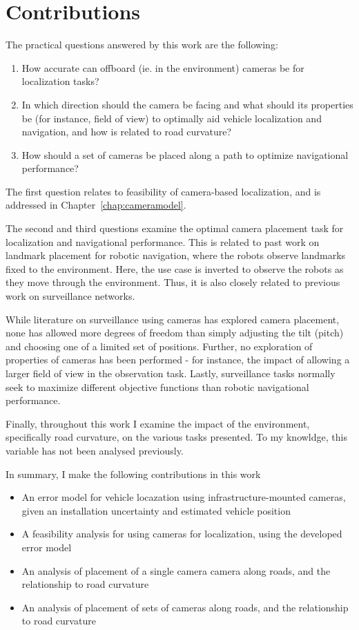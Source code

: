 \documentclass[a4paper,12pt,twoside,openright]{report}
\begin{document}
\section{Contributions}

The practical questions answered by this work are the following:
\begin{enumerate}
    \item How accurate can offboard (ie. in the environment) cameras be for localization tasks?
    \item In which direction should the camera be facing and what should its properties be (for instance, field of view)
          to optimally aid vehicle localization and navigation, and how is related to road curvature?
    \item How should a set of cameras be placed along a path to optimize navigational performance?
\end{enumerate}

The first question relates to feasibility of camera-based localization,
and is addressed in Chapter~\ref{chap:cameramodel}.

The second and third questions examine the optimal camera placement task 
for localization and navigational performance. This is related to past work 
on landmark placement for robotic navigation, where the robots observe landmarks fixed to the environment. 
Here, the use case is inverted to observe the robots as they move through the environment. 
Thus, it is also closely related to previous work on surveillance networks.

While literature on surveillance using cameras has explored camera placement, none 
has allowed more degrees of freedom than simply adjusting the tilt (pitch) 
and choosing one of a limited set of positions. Further, no exploration of 
properties of cameras has been performed - for instance, the impact
of allowing a larger field of view in the observation task. Lastly, surveillance
tasks normally seek to maximize different objective functions than robotic
navigational performance.

Finally, throughout this work I examine the impact of the environment, specifically
road curvature, on the various tasks presented. To my knowldge, this variable has not been
analysed previously.

In summary, I make the following contributions in this work
\begin{itemize}
    \item An error model for vehicle locazation using infrastructure-mounted cameras, given an installation uncertainty and estimated vehicle position
    \item A feasibility analysis for using cameras for localization, using the developed error model
    \item An analysis of placement of a single camera camera along roads, and the relationship to road curvature
    \item An analysis of placement of sets of cameras along roads, and the relationship to road curvature
\end{itemize}
\end{document}
